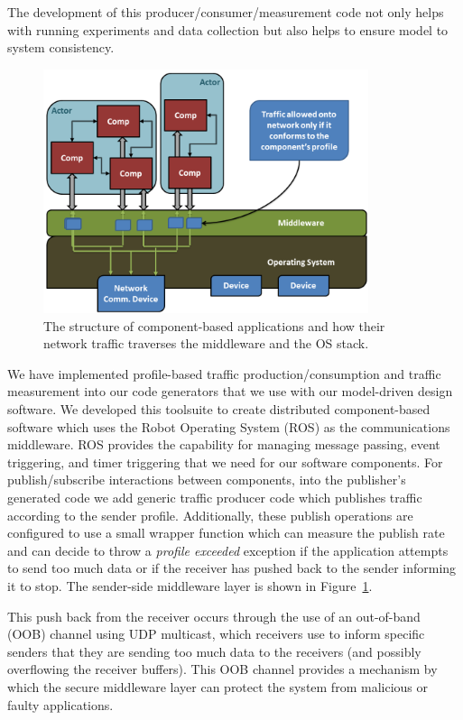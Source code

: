 The development of this producer/consumer/measurement code not only
helps with running experiments and data collection but also helps to
ensure model to system consistency.
  
\begin{figure}[ht!]
  \centering
  \includegraphics[width=0.85\textwidth]{../doc/src/images/results/app_layers.png}
  \caption{The structure of component-based applications and how their network
   traffic traverses the middleware and the OS stack.}
  \label{fig:sender}
\end{figure}

We have implemented profile-based traffic production/consumption and
traffic measurement into our code generators that we use with our
model-driven design software.  We developed this toolsuite to create
distributed component-based software which uses the Robot Operating
System (ROS)\cite{ros} as the communications middleware.  ROS provides
the capability for managing message passing, event triggering, and
timer triggering that we need for our software components.  For
publish/subscribe interactions between components, into the
publisher's generated code we add generic traffic producer code which
publishes traffic according to the sender profile.  Additionally,
these publish operations are configured to use a small wrapper
function which can measure the publish rate and can decide to throw a
\emph{profile exceeded} exception if the application attempts to send
too much data or if the receiver has pushed back to the sender
informing it to stop.  The sender-side middleware layer is shown in
Figure~\ref{fig:sender}.

This push back from the receiver occurs through the use of an
out-of-band (OOB) channel using UDP multicast, which receivers use to
inform specific senders that they are sending too much data to the
receivers (and possibly overflowing the receiver buffers).  This OOB
channel provides a mechanism by which the secure middleware layer can
protect the system from malicious or faulty applications.

